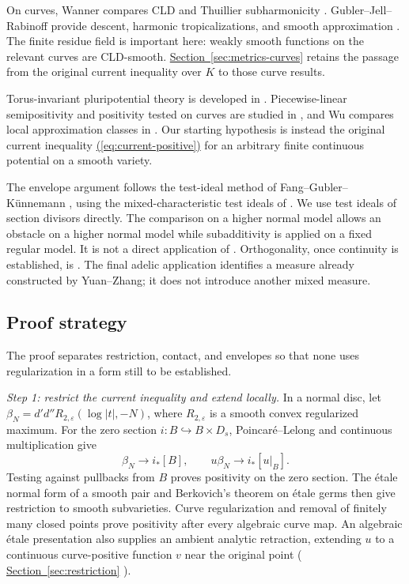 \documentclass[11pt]{amsart}
\theoremstyle{definition}
\theoremstyle{remark}
\numberwithin{equation}{section}
\newcommand{\ddc}{d'd''}
\newcommand{\namedref}[2]{%
 \begingroup
 \ifstrequal{#1}{Section}{\hypersetup{linkcolor=sectionteal}}{%
  \ifstrequal{#1}{Appendix}{\hypersetup{linkcolor=sectionteal}}{}}%
 \hyperref[#2]{#1~\ref*{#2}}%
 \endgroup}
\renewcommand{\eqref}[1]{%
 \begingroup\hypersetup{linkcolor=equationviolet}%
 \hyperref[#1]{\textup{(\ref*{#1})}}%
 \endgroup}
\begin{document}
On curves, Wanner compares CLD and Thuillier subharmonicity
\cite[Corollaries 4.8 and 5.4]{Wanner}.
Gubler--Jell--Rabinoff provide descent, harmonic tropicalizations,
and smooth approximation \cite{GJRforms,GJRcurves}.
The finite residue field is important here: weakly smooth functions
on the relevant curves are CLD-smooth. \namedref{Section}{sec:metrics-curves}
retains the passage from the original current inequality over \(K\)
to those curve results.

Torus-invariant pluripotential theory is developed in \cite{BGJK}.
Piecewise-linear semipositivity and positivity tested on curves are
studied in \cite{GRpl,GRpsh}, and Wu compares local approximation
classes in \cite[Appendix A]{Wu}. Our starting hypothesis is instead
the original current inequality \eqref{eq:current-positive} for an
arbitrary finite continuous potential on a smooth variety.

The envelope argument follows the test-ideal method of
Fang--Gubler--K\"unnemann \cite{FGK}, using the mixed-characteristic
test ideals of \cite{BMP}. We use test ideals of section divisors directly.
The comparison on a higher normal model allows an
obstacle on a higher normal model while subadditivity is applied on
a fixed regular model. It is not a direct application of
\cite[Theorems 5.1 and 7.1]{FGK}. Orthogonality, once continuity is
established, is \cite[Theorem 6.7]{BGM}.
The final adelic application identifies a measure already constructed
by Yuan--Zhang; it does not introduce another mixed measure.

\subsection{Proof strategy}
The proof separates restriction, contact, and envelopes so that none
uses regularization in a form still to be established.

\emph{Step 1: restrict the current inequality and extend locally.}
In a normal disc, let
\(\beta_N=\ddc R_{2,\varepsilon}(\log|t|,-N)\), where
\(R_{2,\varepsilon}\) is a smooth convex regularized maximum.
For the zero section \(i:B\hookrightarrow B\times D_s\),
Poincar\'e--Lelong and continuous multiplication give
\begin{equation}\label{eq:normal-limit-intro}
 \beta_N\longrightarrow i_*[B],
 \qquad u\beta_N\longrightarrow i_*[u|_B].
\end{equation}
Testing against pullbacks from \(B\) proves positivity on the zero
section. The \'etale normal form of a smooth pair and Berkovich's
theorem on \'etale germs then give restriction to smooth
subvarieties. Curve regularization and removal of finitely many
closed points prove positivity after every algebraic curve map.
An algebraic \'etale presentation also supplies an ambient analytic
retraction, extending \(u\) to a continuous curve-positive function
\(v\) near the original point
(\namedref{Section}{sec:restriction}).
\end{document}
